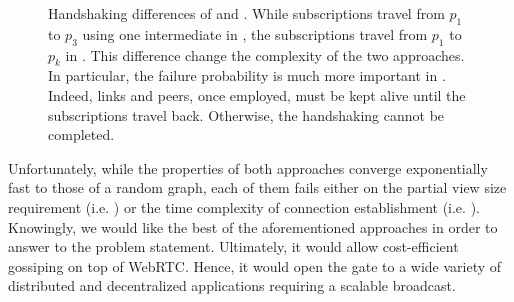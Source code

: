\begin{figure}
  \centering
  
  \caption{\label{fig:handshakeexample}Handshaking differences of \CYCLON{} and
    \SCAMP{}. While subscriptions travel from $p_1$ to $p_3$ using one
    intermediate in \CYCLON{}, the subscriptions travel from $p_1$ to $p_k$ in
    \SCAMP{}. This difference change the complexity of the two approaches. In
    particular, the failure probability is much more important in
    \SCAMP{}. Indeed, links and peers, once employed, must be kept alive until
    the subscriptions travel back. Otherwise, the handshaking cannot be
    completed.}
\end{figure}

Unfortunately, while the properties of both approaches converge exponentially fast
to those of a random graph, each of them fails either on the partial view size requirement
(i.e. \CYCLON{}) or the time complexity of connection establishment
(i.e. \SCAMPLON{}). Knowingly, we would like the best of the aforementioned
approaches in order to answer to the problem statement. Ultimately, it would
allow cost-efficient gossiping on top of WebRTC. Hence, it would open the gate to a wide
variety of distributed and decentralized applications requiring a scalable
broadcast.

